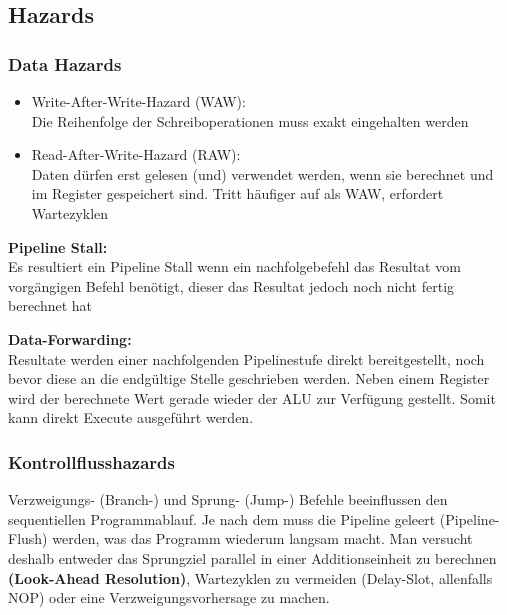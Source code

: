 \subsection{Hazards}
\subsubsection{Data Hazards}
\begin{itemize}[noitemsep,topsep=0pt]
	\item Write-After-Write-Hazard (WAW):\\
	Die Reihenfolge der Schreiboperationen muss exakt eingehalten werden
	\item Read-After-Write-Hazard (RAW):\\
	Daten dürfen erst gelesen (und) verwendet werden, wenn sie berechnet und im Register gespeichert sind. Tritt häufiger auf als WAW, erfordert Wartezyklen
\end{itemize}

\textbf{Pipeline Stall:}\\
Es resultiert ein Pipeline Stall wenn ein nachfolgebefehl das Resultat vom vorgängigen Befehl benötigt, dieser das Resultat jedoch noch nicht fertig berechnet hat

\textbf{Data-Forwarding:}\\
Resultate werden einer nachfolgenden Pipelinestufe direkt bereitgestellt, noch bevor diese an die endgültige Stelle geschrieben werden.
Neben einem Register wird der berechnete Wert gerade wieder der ALU zur Verfügung gestellt.
Somit kann direkt Execute ausgeführt werden.

\subsubsection{Kontrollflusshazards}
Verzweigungs- (Branch-) und Sprung- (Jump-) Befehle beeinflussen den sequentiellen Programmablauf.
Je nach dem muss die Pipeline geleert (Pipeline-Flush) werden, was das Programm wiederum langsam macht.
Man versucht deshalb entweder das Sprungziel parallel in einer Additionseinheit zu berechnen \textbf{(Look-Ahead Resolution)}, Wartezyklen zu vermeiden (Delay-Slot, allenfalls NOP) oder eine Verzweigungsvorhersage zu machen.


